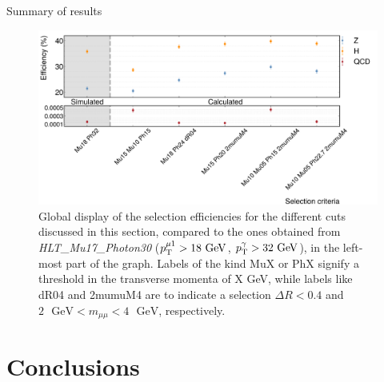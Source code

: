 \documentclass[aspectratio = 1610, xcolor = dvipsnames]{beamer}
\newcommand{\GeV}{\textrm{ }\mathrm{GeV}}
\newcommand{\pt}{p_{\rm T}}
\begin{document}

    \begin{frame}[t]{Summary of results}
        
        \begin{figure}[c]
            \centering
            \includegraphics[width=1\textwidth]{images/eff_comparison.pdf}
            \caption{Global display of the selection efficiencies for the different cuts discussed in this section, compared to the ones obtained from {\it HLT\_Mu17\_Photon30} ($\pt^{\mu 1} > 18\GeV$, $\pt^{\gamma} > 32\GeV$), in the left-most part of the graph. Labels of the kind MuX or PhX signify a threshold in the transverse momenta of X GeV, while labels like dR04 and 2mumuM4 are to indicate a selection $\Delta R < 0.4$ and $2\GeV < m_{\mu\mu} < 4\GeV$, respectively.
            \label{im:eff_comparison}}
        \end{figure}

    \end{frame}


    \section{Conclusions}
    
\end{document}
